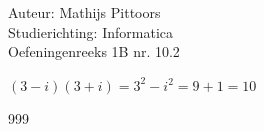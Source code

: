 \documentclass[a4paper]{article}
\begin{document}
  
\noindent \large Auteur: Mathijs Pittoors \\
\noindent \large Studierichting: Informatica\\
\noindent \large Oefeningenreeks 1B nr. 10.2\\

\medskip

\normalsize

$(3-i)(3+i) = 3^2 - i^2 = 9 + 1 = 10$

\begin{thebibliography}{999}
\end{thebibliography}
\end{document}
